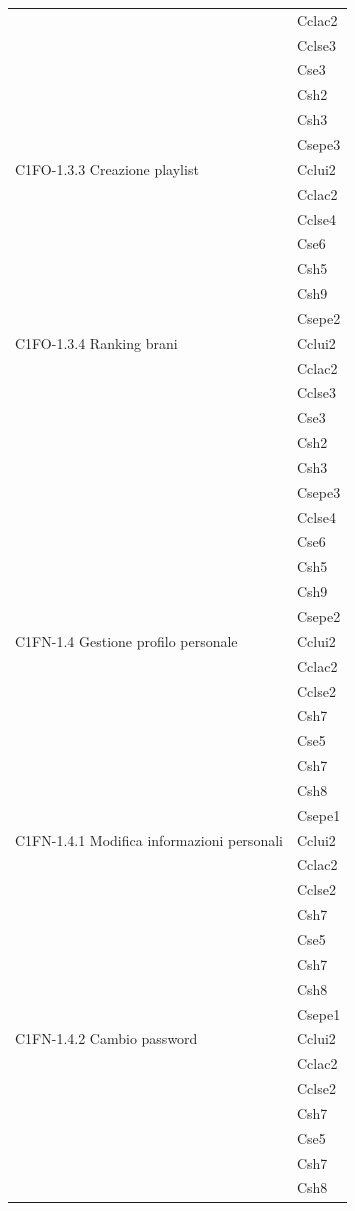 \begin{footnotesize}
\begin{longtable}[!h]{|l|l|}
& Cclac2\\
& Cclse3\\
& Cse3\\
& Csh2\\
& Csh3\\
& Csepe3\\\hline   
C1FO-1.3.3 Creazione playlist & Cclui2\\
& Cclac2\\
& Cclse4\\
& Cse6\\
& Csh5\\
& Csh9\\
& Csepe2\\\hline  
C1FO-1.3.4 Ranking brani & Cclui2\\
& Cclac2\\
& Cclse3\\
& Cse3\\
& Csh2\\
& Csh3\\
& Csepe3\\
& Cclse4\\
& Cse6\\
& Csh5\\
& Csh9\\
& Csepe2  \\\hline             
C1FN-1.4 Gestione profilo personale & Cclui2\\
& Cclac2\\
& Cclse2\\
& Csh7\\
& Cse5\\
& Csh7\\
& Csh8\\
& Csepe1\\\hline 
C1FN-1.4.1 Modifica informazioni personali & Cclui2\\
& Cclac2\\
& Cclse2\\
& Csh7\\
& Cse5\\
& Csh7\\
& Csh8\\
& Csepe1\\\hline  
C1FN-1.4.2 Cambio password & Cclui2 \\
& Cclac2\\
& Cclse2\\
& Csh7\\
& Cse5\\
& Csh7\\
& Csh8\\

\end{longtable}
\end{footnotesize}
